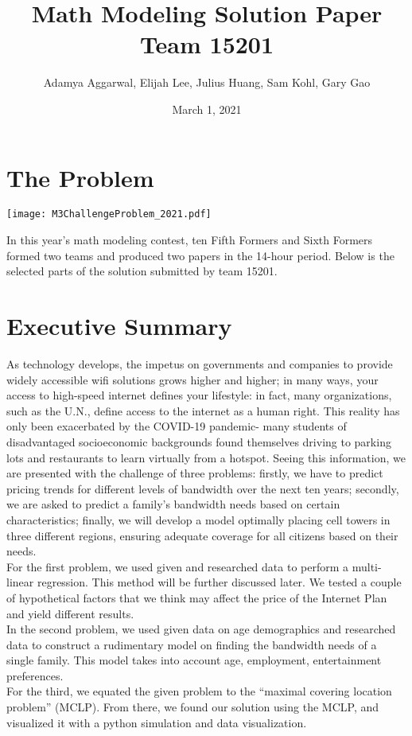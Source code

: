 


	\section*{The Problem}
		\texttt{[image: M3ChallengeProblem\_2021.pdf]}

\title{Math Modeling Solution Paper Team 15201}
\author{Adamya Aggarwal, Elijah Lee, Julius Huang, Sam Kohl, Gary Gao}
\date{March 1, 2021}
\maketitle
 
\onehalfspacing

In this year's math modeling contest, ten Fifth Formers and Sixth Formers formed two teams and produced two papers in the 14-hour period. Below is the selected parts of the solution submitted by team 15201.

\section{Executive Summary}

	As technology develops, the impetus on governments and companies to provide widely accessible wifi solutions grows higher and higher; in many ways, your access to high-speed internet defines your lifestyle: in fact, many organizations, such as the U.N., define access to the internet as a human right. This reality has only been exacerbated by the COVID-19 pandemic- many students of disadvantaged socioeconomic backgrounds found themselves driving to parking lots and restaurants to learn virtually from a hotspot. Seeing this information, we are presented with the challenge of three problems: firstly, we have to predict pricing trends for different levels of bandwidth over the next ten years; secondly, we are asked to predict a family’s bandwidth needs based on certain characteristics; finally, we will develop a model optimally placing cell towers in three different regions, ensuring adequate coverage for all citizens based on their needs.\\
	\indent For the first problem, we used given and researched data to perform a multi-linear regression. This method will be further discussed later. We tested a couple of hypothetical factors that we think may affect the price of the Internet Plan and yield different results. \\
	\indent In the second problem, we used given data on age demographics and researched data to construct a rudimentary model on finding the bandwidth needs of a single family. This model takes into account age, employment, entertainment preferences.\\ 
	\indent For the third, we equated the given problem to the “maximal covering location problem” (MCLP). From there, we found our solution using the MCLP, and visualized it with a python simulation and data visualization. 

